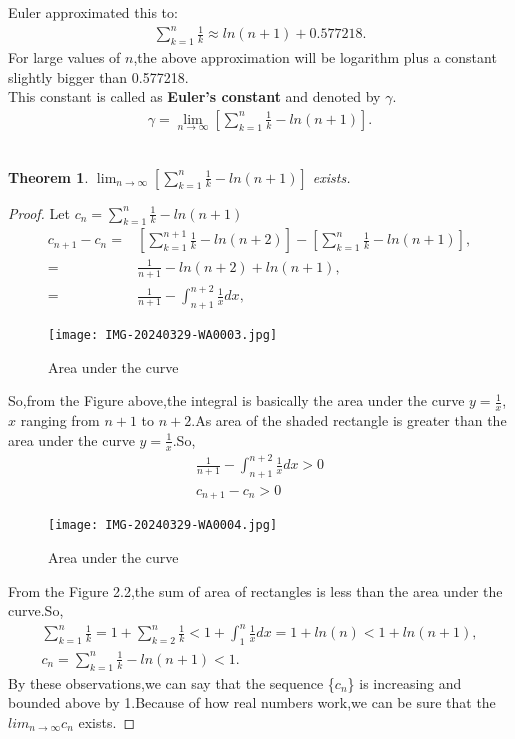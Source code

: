 \documentclass[a4paper,reqno,11pt]{book}
\theoremstyle{plain}%
\newtheorem{thm}{Theorem}[chapter]
\theoremstyle{definition}
\begin{document}
Euler approximated this to:\\
\begin{eqnarray*}
    \sum_{k=1}^{n}\frac{1}{k}\approx ln(n+1)+0.577218.
\end{eqnarray*}
For large values of $n$,the above approximation will be logarithm plus a constant slightly bigger than 0.577218.\\
This constant is called as \textbf{Euler's constant} and denoted by $\gamma$.
\begin{eqnarray*}
\gamma=\lim_{n\to\infty}[\sum_{k=1}^{n}\frac{1}{k}-ln(n+1)].
\end{eqnarray*}
\\
\begin{thm}\label{thm:Type3} $\lim_{n\to\infty}[\sum_{k=1}^{n}\frac{1}{k}-ln(n+1)]$ exists.
\end{thm}
\begin{proof} Let $c_{n}=\sum_{k=1}^{n}\frac{1}{k}-ln(n+1)$\\
\begin{align*}
c_{n+1}-c_{n}=&\left[\sum_{k=1}^{n+1}\frac{1}{k}-ln(n+2)\right]-\left[\sum_{k=1}^{n}\frac{1}{k}-ln(n+1)\right],\\
    =&\frac{1}{n+1}-ln(n+2)+ln(n+1),\\
    =&\frac{1}{n+1}-\int_{n+1}^{n+2}\frac{1}{x}dx,
\end{align*}
\begin{figure}[h]
    \centering
    \texttt{[image: IMG-20240329-WA0003.jpg]}
    \caption{Area under the curve}
    \label{fig:IMG-20240329-WA0003}
\end{figure}
So,from the Figure above,the integral is basically the area under the curve $y=\frac{1}{x}$,$x$ ranging from $n+1$ to $n+2$.As area of the shaded rectangle is greater than the area under the curve $y=\frac{1}{x}$.So,\\
\begin{eqnarray*}
    \frac{1}{n+1}-\int_{n+1}^{n+2}\frac{1}{x}dx > 0\\
   c_{n+1}-c_{n}>0
\end{eqnarray*}
\begin{figure}[h]
    \centering
    \texttt{[image: IMG-20240329-WA0004.jpg]}
    \caption{Area under the curve}
    \label{fig:IMG-20240329-WA0004}
\end{figure}
\noindent From the Figure 2.2,the sum of area of rectangles is less than the area under the curve.So,
\begin{eqnarray*}
    \sum_{k=1}^{n}\frac{1}{k}=1+\sum_{k=2}^{n}\frac{1}{k}<1+\int_{1}^{n}\frac{1}{x}dx=1+ln(n)<1+ln(n+1),\\
     c_{n}=\sum_{k=1}^{n}\frac{1}{k}-ln(n+1) < 1.
\end{eqnarray*}
\noindent By these observations,we can say that the sequence \{$c_{n}$\} is increasing and bounded above by 1.Because of how real numbers work,we can be sure that the $lim_{n\to\infty}c_{n}$ exists.
\end{proof}
\end{document}
